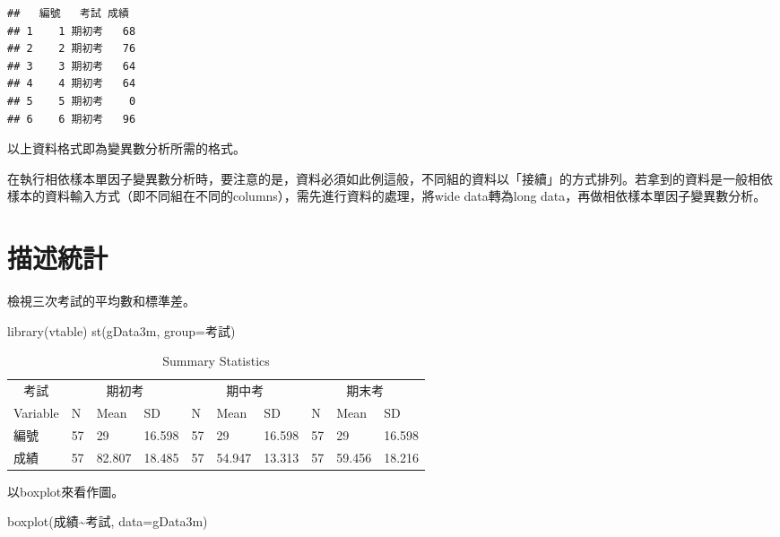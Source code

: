 \documentclass[
]{book}
\newenvironment{Shaded}{\begin{snugshade}}{\end{snugshade}}
\newcommand{\AttributeTok}[1]{\textcolor[rgb]{0.77,0.63,0.00}{#1}}
\newcommand{\FunctionTok}[1]{\textcolor[rgb]{0.00,0.00,0.00}{#1}}
\newcommand{\NormalTok}[1]{#1}
\newcommand{\SpecialCharTok}[1]{\textcolor[rgb]{0.00,0.00,0.00}{#1}}
\newcommand{\StringTok}[1]{\textcolor[rgb]{0.31,0.60,0.02}{#1}}
\begin{document}
\begin{verbatim}
##   編號   考試 成績
## 1    1 期初考   68
## 2    2 期初考   76
## 3    3 期初考   64
## 4    4 期初考   64
## 5    5 期初考    0
## 6    6 期初考   96
\end{verbatim}

以上資料格式即為變異數分析所需的格式。

在執行相依樣本單因子變異數分析時，要注意的是，資料必須如此例這般，不同組的資料以「接續」的方式排列。若拿到的資料是一般相依樣本的資料輸入方式（即不同組在不同的columns），需先進行資料的處理，將wide data轉為long data，再做相依樣本單因子變異數分析。

\hypertarget{ux63cfux8ff0ux7d71ux8a08-1}{%
\section{描述統計}\label{ux63cfux8ff0ux7d71ux8a08-1}}

檢視三次考試的平均數和標準差。

\begin{Shaded}
\begin{Highlighting}[]
\FunctionTok{library}\NormalTok{(vtable)}
\FunctionTok{st}\NormalTok{(gData3m, }\AttributeTok{group=}\StringTok{\textquotesingle{}考試\textquotesingle{}}\NormalTok{)}
\end{Highlighting}
\end{Shaded}

\begin{table}

\caption{\label{tab:unnamed-chunk-65}Summary Statistics}
\centering
\begin{tabular}[t]{llllllllll}
\toprule
\multicolumn{1}{c}{考試} & \multicolumn{3}{c}{期初考} & \multicolumn{3}{c}{期中考} & \multicolumn{3}{c}{期末考} \\
\cmidrule(l{3pt}r{3pt}){1-1} \cmidrule(l{3pt}r{3pt}){2-4} \cmidrule(l{3pt}r{3pt}){5-7} \cmidrule(l{3pt}r{3pt}){8-10}
Variable & N & Mean & SD & N & Mean & SD & N & Mean & SD\\
\midrule
編號 & 57 & 29 & 16.598 & 57 & 29 & 16.598 & 57 & 29 & 16.598\\
成績 & 57 & 82.807 & 18.485 & 57 & 54.947 & 13.313 & 57 & 59.456 & 18.216\\
\bottomrule
\end{tabular}
\end{table}

以boxplot來看作圖。

\begin{Shaded}
\begin{Highlighting}[]
\FunctionTok{boxplot}\NormalTok{(成績}\SpecialCharTok{\textasciitilde{}}\NormalTok{考試, }\AttributeTok{data=}\NormalTok{gData3m)}
\end{Highlighting}
\end{Shaded}
\end{document}
